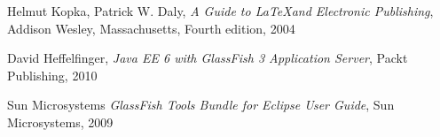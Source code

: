 \begin{thebibliography}{9}
		Helmut Kopka,
		Patrick W. Daly,
	  	\emph{A Guide to \LaTeX and Electronic Publishing},
	  	Addison Wesley, Massachusetts,
	  	Fourth edition,
	  	2004
	
		David Heffelfinger,
		\emph{Java EE 6 with GlassFish 3 Application Server},
		Packt Publishing,
		2010
		
		Sun Microsystems
		\emph{GlassFish Tools Bundle for Eclipse User Guide},
		Sun Microsystems,
		2009

\end{thebibliography}